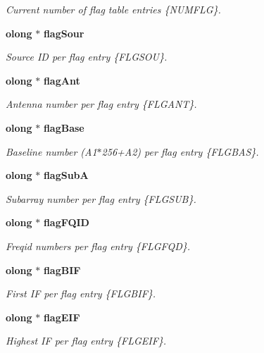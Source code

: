 \begin{CompactItemize}
\begin{CompactList}\small\item\em Current number of flag table entries \{NUMFLG\}. \item\end{CompactList}\item 
{\bf olong} $\ast$ {\bf flag\-Sour}
\begin{CompactList}\small\item\em Source ID per flag entry \{FLGSOU\}. \item\end{CompactList}\item 
{\bf olong} $\ast$ {\bf flag\-Ant}
\begin{CompactList}\small\item\em Antenna number per flag entry \{FLGANT\}. \item\end{CompactList}\item 
{\bf olong} $\ast$ {\bf flag\-Base}
\begin{CompactList}\small\item\em Baseline number (A1$\ast$256+A2) per flag entry \{FLGBAS\}. \item\end{CompactList}\item 
{\bf olong} $\ast$ {\bf flag\-Sub\-A}
\begin{CompactList}\small\item\em Subarray number per flag entry \{FLGSUB\}. \item\end{CompactList}\item 
{\bf olong} $\ast$ {\bf flag\-FQID}
\begin{CompactList}\small\item\em Freqid numbers per flag entry \{FLGFQD\}. \item\end{CompactList}\item 
{\bf olong} $\ast$ {\bf flag\-BIF}
\begin{CompactList}\small\item\em First IF per flag entry \{FLGBIF\}. \item\end{CompactList}\item 
{\bf olong} $\ast$ {\bf flag\-EIF}
\begin{CompactList}\small\item\em Highest IF per flag entry \{FLGEIF\}. \item\end{CompactList}\item 

\end{CompactItemize}
